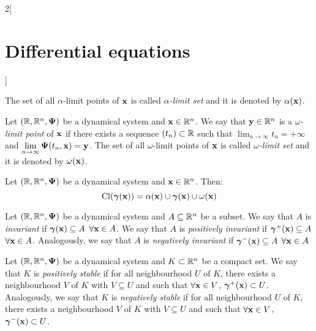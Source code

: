 \documentclass[../../../main.tex]{subfiles}
\begin{document}
\begin{multicols}{2}[\section{Differential equations}]
\begin{definition}
    The set of all $\alpha$-limit points of $\boldsymbol{\mathrm{x}}$ is called \textit{$\alpha$-limit set} and it is denoted by $\alpha(\boldsymbol{\mathrm{x}})$.
  \end{definition}
  \begin{definition}
    Let $(\mathbb{R},\mathbb{R}^n,\boldsymbol{\mathrm{\Psi}})$ be a dynamical system and $\boldsymbol{\mathrm{x}}\in\mathbb{R}^n$. We say that $\boldsymbol{\mathrm{y}}\in\mathbb{R}^n$ is a \textit{$\omega$-limit point} of $\boldsymbol{\mathrm{x}}$ if there exists a sequence $(t_n)\subset\mathbb{R}$ such that $\displaystyle\lim_{n\to\infty}t_n=+\infty$ and $\displaystyle\lim_{n\to\infty}\boldsymbol{\mathrm{\Psi}}(t_n,\boldsymbol{\mathrm{x}})=\boldsymbol{\mathrm{y}}$.
    The set of all $\omega$-limit points of $\boldsymbol{\mathrm{x}}$ is called \textit{$\omega$-limit set} and it is denoted by $\omega(\boldsymbol{\mathrm{x}})$.
  \end{definition}
  \begin{prop}
    Let $(\mathbb{R},\mathbb{R}^n,\boldsymbol{\mathrm{\Psi}})$ be a dynamical system and $\boldsymbol{\mathrm{x}}\in\mathbb{R}^n$. Then: $$\operatorname{Cl}(\boldsymbol{\mathrm{\gamma}}(\boldsymbol{\mathrm{x}}))=\alpha(\boldsymbol{\mathrm{x}})\cup\boldsymbol{\mathrm{\gamma}}(\boldsymbol{\mathrm{x}})\cup\omega(\boldsymbol{\mathrm{x}})$$
  \end{prop}
  \begin{definition}
    Let $(\mathbb{R},\mathbb{R}^n,\boldsymbol{\mathrm{\Psi}})$ be a dynamical system and $A\subseteq \mathbb{R}^n$ be a subset. We say that $A$ is \textit{invariant} if $\boldsymbol{\mathrm{\gamma}}(\boldsymbol{\mathrm{x}})\subseteq A$ $\forall\boldsymbol{\mathrm{x}}\in A$. We say that $A$ is \textit{positively invariant} if $\boldsymbol{\mathrm{\gamma}}^+(\boldsymbol{\mathrm{x}})\subseteq A$ $\forall\boldsymbol{\mathrm{x}}\in A$. Analogously, we say that $A$ is \textit{negatively invariant} if $\boldsymbol{\mathrm{\gamma}}^-(\boldsymbol{\mathrm{x}})\subseteq A$ $\forall\boldsymbol{\mathrm{x}}\in A$
  \end{definition}
  \begin{definition}
    Let $(\mathbb{R},\mathbb{R}^n,\boldsymbol{\mathrm{\Psi}})$ be a dynamical system and $K\subset \mathbb{R}^n$ be a compact set. We say that $K$ is \textit{positively stable} if for all neighbourhood $U$ of $K$, there exists a neighbourhood $V$ of $K$ with $V\subseteq U$ and such that $\forall \boldsymbol{\mathrm{x}}\in V$, $\boldsymbol{\mathrm{\gamma}}^+(\boldsymbol{\mathrm{x}})\subset U$. Analogously, we say that $K$ is \textit{negatively stable} if for all neighbourhood $U$ of $K$, there exists a neighbourhood $V$ of $K$ with $V\subseteq U$ and such that $\forall \boldsymbol{\mathrm{x}}\in V$, $\boldsymbol{\mathrm{\gamma}}^-(\boldsymbol{\mathrm{x}})\subset U$.
  \end{definition}

\end{multicols}
\end{document}

